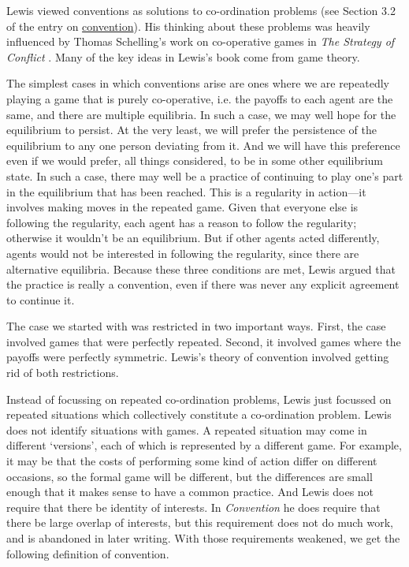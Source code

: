 Lewis viewed conventions as solutions to co-ordination problems (see Section 3.2 of the entry on \href{http://plato.stanford.edu/convention/index.html#Lew}{convention}). His thinking about these problems was heavily influenced by Thomas Schelling's work on co-operative games in \textit{The Strategy of Conflict} \citep{Schelling1960}. Many of the key ideas in Lewis's book come from game theory.

The simplest cases in which conventions arise are ones where we are repeatedly playing a game that is purely co-operative, i.e. the payoffs to each agent are the same, and there are multiple equilibria. In such a case, we may well hope for the equilibrium to persist. At the very least, we will prefer the persistence of the equilibrium to any one person deviating from it. And we will have this preference even if we would prefer, all things considered, to be in some other equilibrium state. In such a case, there may well be a practice of continuing to play one's part in the equilibrium that has been reached. This is a regularity in action---it involves making moves in the repeated game. Given that everyone else is following the regularity, each agent has a reason to follow the regularity; otherwise it wouldn't be an equilibrium. But if other agents acted differently, agents would not be interested in following the regularity, since there are alternative equilibria. Because these three conditions are met, Lewis argued that the practice is really a convention, even if there was never any explicit agreement to continue it.

The case we started with was restricted in two important ways. First, the case involved games that were perfectly repeated. Second, it involved games where the payoffs were perfectly symmetric. Lewis's theory of convention involved getting rid of both restrictions.

Instead of focussing on repeated co-ordination problems, Lewis just focussed on repeated situations which collectively constitute a co-ordination problem. Lewis does not identify situations with games. A repeated situation may come in different `versions', each of which is represented by a different game. For example, it may be that the costs of performing some kind of action differ on different occasions, so the formal game will be different, but the differences are small enough that it makes sense to have a common practice. And Lewis does not require that there be identity of interests. In \textit{Convention} he does require that there be large overlap of interests, but this requirement does not do much work, and is abandoned in later writing. With those requirements weakened, we get the following definition of convention.

